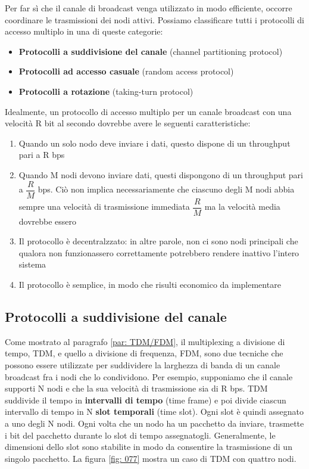 \documentclass[11pt,a4paper]{book}
\begin{document}
Per far sì che il canale di broadcast venga utilizzato in modo efficiente, occorre coordinare le trasmissioni dei nodi attivi. Possiamo classificare tutti i protocolli di accesso multiplo in una di queste categorie:
\begin{itemize}
	\item \textbf{Protocolli a suddivisione del canale} (channel partitioning protocol)
	\item \textbf{Protocolli ad accesso casuale} (random access protocol)
	\item \textbf{Protocolli a rotazione }(taking-turn protocol)
\end{itemize}
Idealmente, un protocollo di accesso multiplo per un canale broadcast con una velocità R bit al secondo dovrebbe avere le seguenti caratteristiche:
\begin{enumerate}
	\item Quando un solo nodo deve inviare i dati, questo dispone di un throughput pari a R bps
	\item Quando M nodi devono inviare dati, questi dispongono di un throughput pari a $\dfrac{R}{M}$ bps. Ciò non implica necessariamente che ciascuno degli M nodi abbia sempre una velocità di trasmissione immediata $\dfrac{R}{M}$ ma la velocità media dovrebbe essero
	\item Il protocollo è decentralzzato: in altre parole, non ci sono nodi principali che qualora non funzionassero correttamente potrebbero rendere inattivo l'intero sistema
	\item Il protocollo è semplice, in modo che risulti economico da implementare
\end{enumerate}

\subsection{Protocolli a suddivisione del canale}
Come mostrato al paragrafo \ref{par: TDM/FDM}, il multiplexing a divisione di tempo, TDM, e quello a divisione di frequenza, FDM, sono due tecniche che possono essere utilizzate per suddividere la larghezza di banda di un canale broadcast fra i nodi che lo condividono. Per esempio, supponiamo che il canale supporti N nodi e che la sua velocità di trasmissione sia di R bps. TDM suddivide il tempo in \textbf{intervalli di tempo} (time frame) e poi divide ciascun intervallo di tempo in N \textbf{slot temporali} (time slot). Ogni slot è quindi assegnato a uno degli N nodi. Ogni volta che un nodo ha un pacchetto da inviare, trasmette i bit del pacchetto durante lo slot di tempo assegnatogli. Generalmente, le dimensioni dello slot sono stabilite in modo da consentire la trasmissione di un singolo pacchetto. La figura \ref{fig: 077} mostra un caso di TDM con quattro nodi.
\end{document}
